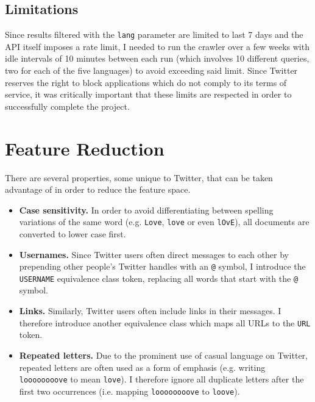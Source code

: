 \subsection{Limitations}

Since results filtered with the \verb|lang| parameter are limited to last 7 days and the API itself imposes a rate limit, I needed to run the crawler over a few weeks with idle intervals of 10 minutes between each run (which involves 10 different queries, two for each of the five languages) to avoid exceeding said limit. Since Twitter reserves the right to block applications which do not comply to its terms of service, it was critically important that these limits are respected in order to successfully complete the project.

\section{Feature Reduction}

There are several properties, some unique to Twitter, that can be taken advantage of in order to reduce the feature space.

\begin{itemize}
  \item \textbf{Case sensitivity.} In order to avoid differentiating between spelling variations of the same word (e.g. \verb|Love|, \verb|love| or even \verb|lOvE|), all documents are converted to lower case first.

  \item \textbf{Usernames.} Since Twitter users often direct messages to each other by prepending other people's Twitter handles with an \verb|@| symbol, I introduce the \verb|USERNAME| equivalence class token, replacing all words that start with the \verb|@| symbol.

  \item \textbf{Links.} Similarly, Twitter users often include links in their messages. I therefore introduce another equivalence class which maps all URLs to the \verb|URL| token.

  \item \textbf{Repeated letters.} Due to the prominent use of casual language on Twitter, repeated letters are often used as a form of emphasis (e.g. writing \verb|loooooooove| to mean \verb|love|). I therefore ignore all duplicate letters after the first two occurrences (i.e. mapping \verb|loooooooove| to \verb|loove|).
\end{itemize}

